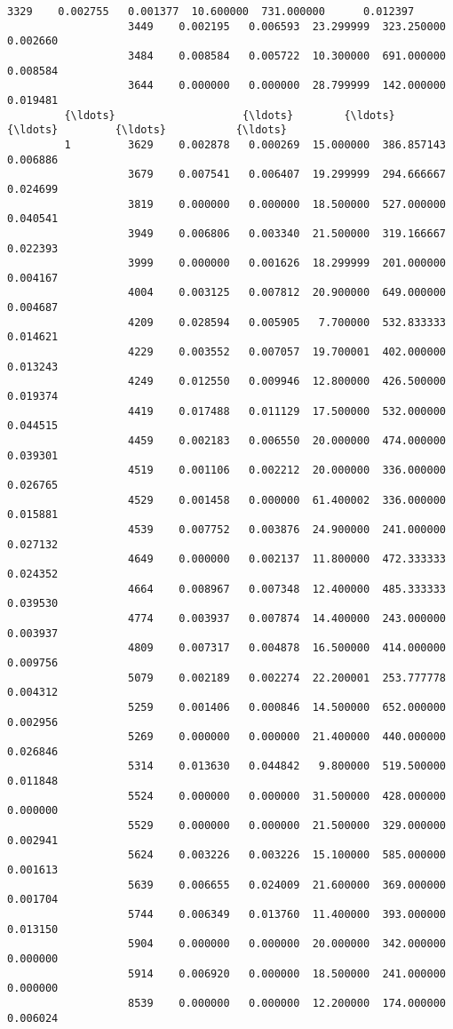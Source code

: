 \documentclass[11pt]{article}
\begin{document}
\begin{Verbatim}[commandchars=\\\{\}]
                   3329    0.002755   0.001377  10.600000  731.000000      0.012397   
                   3449    0.002195   0.006593  23.299999  323.250000      0.002660   
                   3484    0.008584   0.005722  10.300000  691.000000      0.008584   
                   3644    0.000000   0.000000  28.799999  142.000000      0.019481   
         {\ldots}                    {\ldots}        {\ldots}        {\ldots}         {\ldots}           {\ldots}   
         1         3629    0.002878   0.000269  15.000000  386.857143      0.006886   
                   3679    0.007541   0.006407  19.299999  294.666667      0.024699   
                   3819    0.000000   0.000000  18.500000  527.000000      0.040541   
                   3949    0.006806   0.003340  21.500000  319.166667      0.022393   
                   3999    0.000000   0.001626  18.299999  201.000000      0.004167   
                   4004    0.003125   0.007812  20.900000  649.000000      0.004687   
                   4209    0.028594   0.005905   7.700000  532.833333      0.014621   
                   4229    0.003552   0.007057  19.700001  402.000000      0.013243   
                   4249    0.012550   0.009946  12.800000  426.500000      0.019374   
                   4419    0.017488   0.011129  17.500000  532.000000      0.044515   
                   4459    0.002183   0.006550  20.000000  474.000000      0.039301   
                   4519    0.001106   0.002212  20.000000  336.000000      0.026765   
                   4529    0.001458   0.000000  61.400002  336.000000      0.015881   
                   4539    0.007752   0.003876  24.900000  241.000000      0.027132   
                   4649    0.000000   0.002137  11.800000  472.333333      0.024352   
                   4664    0.008967   0.007348  12.400000  485.333333      0.039530   
                   4774    0.003937   0.007874  14.400000  243.000000      0.003937   
                   4809    0.007317   0.004878  16.500000  414.000000      0.009756   
                   5079    0.002189   0.002274  22.200001  253.777778      0.004312   
                   5259    0.001406   0.000846  14.500000  652.000000      0.002956   
                   5269    0.000000   0.000000  21.400000  440.000000      0.026846   
                   5314    0.013630   0.044842   9.800000  519.500000      0.011848   
                   5524    0.000000   0.000000  31.500000  428.000000      0.000000   
                   5529    0.000000   0.000000  21.500000  329.000000      0.002941   
                   5624    0.003226   0.003226  15.100000  585.000000      0.001613   
                   5639    0.006655   0.024009  21.600000  369.000000      0.001704   
                   5744    0.006349   0.013760  11.400000  393.000000      0.013150   
                   5904    0.000000   0.000000  20.000000  342.000000      0.000000   
                   5914    0.006920   0.000000  18.500000  241.000000      0.000000   
                   8539    0.000000   0.000000  12.200000  174.000000      0.006024   
         

\end{Verbatim}
\end{document}
